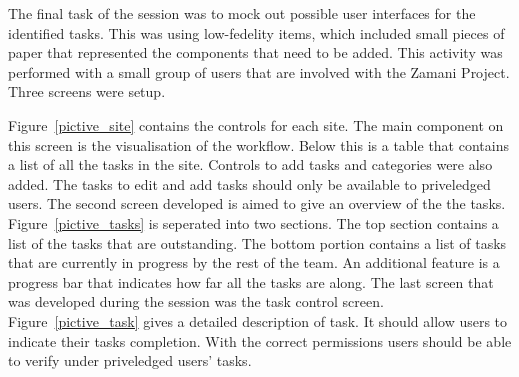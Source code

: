 \documentclass[12pt,a4paper]{report}
\begin{document}
The final task of the session was to mock out possible user interfaces for the
identified tasks. This was using low-fedelity items, which included small pieces
of paper that represented the components that need to be added. This activity
was performed with a small group of users that are involved with the Zamani Project.
Three screens were setup.

Figure~\ref{pictive_site} contains the controls for each site. The main component
on this screen is the visualisation of the workflow. Below this is a table that
contains a list of all the tasks in the site. Controls to add tasks and categories
were also added. The tasks to edit and add tasks should only be available to priveledged
users. The second screen developed is aimed to give an overview of the
the tasks. Figure~\ref{pictive_tasks} is seperated into two sections. The top
section contains a list of the tasks that are outstanding. The bottom  portion
contains a list of tasks that are currently in progress by the rest of the team.
An additional feature is a progress bar that indicates how far all the tasks are
along. The last screen that was developed during the session was the task control
screen. Figure~\ref{pictive_task} gives a detailed description of task. It should
allow users to indicate their tasks completion. With the correct permissions users
should be able to verify under priveledged users' tasks.
\end{document}
